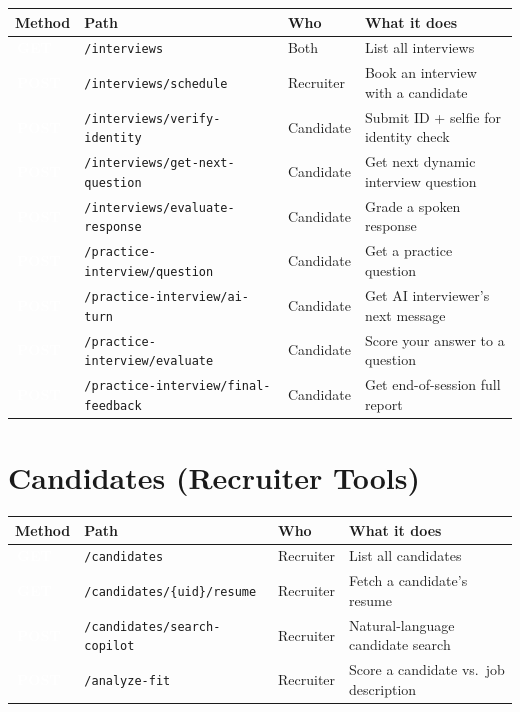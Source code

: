 \documentclass[12pt, a4paper]{report}
\newcommand{\code}[1]{\texttt{\small #1}}
\newcommand{\badge}[2]{%
  \colorbox{#1}{\textcolor{white}{\tiny\bfseries\,#2\,}}%
}
\newcommand{\GET}{\badge{successgr}{GET}}
\newcommand{\POST}{\badge{infoblue}{POST}}
\begin{document}
{\begin{longtable}{p{1.5cm}p{5.5cm}p{2.2cm}p{5.5cm}}
\toprule
\textbf{Method} & \textbf{Path} & \textbf{Who} & \textbf{What it does} \\
\midrule
\endhead
\GET  & \code{/interviews}                       & Both      & List all interviews \\
\POST & \code{/interviews/schedule}              & Recruiter & Book an interview with a candidate \\
\POST & \code{/interviews/verify-identity}       & Candidate & Submit ID + selfie for identity check \\
\POST & \code{/interviews/get-next-question}     & Candidate & Get next dynamic interview question \\
\POST & \code{/interviews/evaluate-response}     & Candidate & Grade a spoken response \\
\POST & \code{/practice-interview/question}      & Candidate & Get a practice question \\
\POST & \code{/practice-interview/ai-turn}       & Candidate & Get AI interviewer's next message \\
\POST & \code{/practice-interview/evaluate}      & Candidate & Score your answer to a question \\
\POST & \code{/practice-interview/final-feedback}& Candidate & Get end-of-session full report \\
\bottomrule
\end{longtable}

\section{Candidates (Recruiter Tools)}

\begin{longtable}{p{1.5cm}p{5.5cm}p{2.2cm}p{5.5cm}}
\toprule
\textbf{Method} & \textbf{Path} & \textbf{Who} & \textbf{What it does} \\
\midrule
\endhead
\GET  & \code{/candidates}                & Recruiter & List all candidates \\
\GET  & \code{/candidates/\{uid\}/resume} & Recruiter & Fetch a candidate's resume \\
\POST & \code{/candidates/search-copilot} & Recruiter & Natural-language candidate search \\
\POST & \code{/analyze-fit}               & Recruiter & Score a candidate vs.\ job description \\
\bottomrule
\end{longtable}

}
\end{document}
